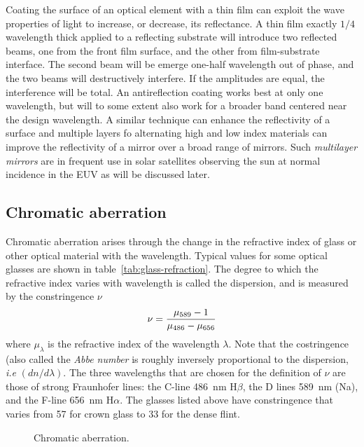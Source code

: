 \documentclass{article}
\begin{document}
Coating the surface of an optical element with a thin film can exploit
the wave properties of light to increase, or decrease, its
reflectance. A thin film exactly ${1/4}$ wavelength thick applied to a
reflecting substrate will introduce two reflected beams, one from the front film
surface, and the other from film-substrate interface. The second beam
will be emerge one-half wavelength out of phase, and the two beams
will destructively interfere. If the amplitudes are equal, the
interference will be total. An antireflection coating works best at only
one wavelength, but will to some extent also work for a broader band
centered near the design wavelength. A similar technique can enhance
the reflectivity of a surface and multiple layers fo alternating high
and low index materials can improve the reflectivity of a mirror over
a broad range of mirrors. Such {\it multilayer mirrors} are in
frequent use in solar satellites observing the sun at normal incidence
in the EUV as will be discussed later.

\subsection{Chromatic aberration}

Chromatic aberration arises through the change in the refractive index of
glass or other optical material with the wavelength. Typical values for
some optical glasses are shown in table~\ref{tab:glass-refraction}. The 
degree to which the refractive index varies with wavelength is called the 
dispersion, and is measured by the constringence $\nu$
\begin{equation}
\nu={\mu_{589}-1\over\mu_{486}-\mu_{656}}\label{eq:costringence}
\end{equation}
where $\mu_\lambda$ is the refractive index of the wavelength $\lambda$. Note
that the costringence (also called the {\it Abbe number} is roughly inversely 
proportional to the dispersion, {\it i.e} $({dn/d\lambda})$.  The
three wavelengths that are chosen for the definition of $\nu$ are those
of strong Fraunhofer lines: the C-line 486~nm H$\beta$, the D lines 589~nm (Na), 
and the F-line 656~nm H$\alpha$. The glasses listed above have constringence that 
varies from 57 for crown glass to 33 for the dense flint. 

\begin{figure}[th!]
 \hfil{}\hfil
  \caption{Chromatic aberration.}
  \label{fig:chromatic-aberration}
\end{figure}
\end{document}
